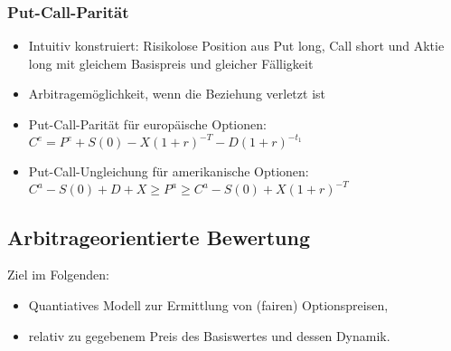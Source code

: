 \subsubsection{Put-Call-Parität}
\begin{itemize}
	\item Intuitiv konstruiert: Risikolose Position aus Put long, Call short und Aktie long mit gleichem Basispreis und gleicher Fälligkeit
	\item Arbitragemöglichkeit, wenn die Beziehung verletzt ist
	\item Put-Call-Parität für europäische Optionen: \(C^e = P^e + S(0) - X(1+r)^{-T} - D(1+r)^{-t_1}\)
	\item Put-Call-Ungleichung für amerikanische Optionen: \(C^a - S(0) + D + X \ge P^a \ge C^a - S(0) + X(1+r)^{-T}\)
\end{itemize}


\subsection{Arbitrageorientierte Bewertung}
Ziel im Folgenden:
\begin{itemize}
	\item Quantiatives Modell zur Ermittlung von (fairen) Optionspreisen,
	\item relativ zu gegebenem Preis des Basiswertes und dessen Dynamik.
\end{itemize}

